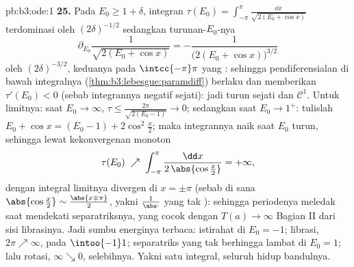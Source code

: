 \begin{solution}{pb:b3:ode:1}
\textbf{25.} Pada $E_0 \geq 1 + \delta$, integran
$\tau(E_0) = \int_{-\pi}^{\pi}\frac{\dd x}{\sqrt{2(E_0 +
\cos x)}}$ terdominasi oleh $(2\delta)^{-1/2}$ sedangkan
turunan-$E_0$-nya
\[
\partial_{E_0}\frac1{\sqrt{2(E_0 + \cos x)}}
= -\frac{1}{\bigl(2(E_0 + \cos x)\bigr)^{3/2}}
\]
oleh $(2\delta)^{-3/2}$, keduanya  pada
$\intcc{-\pi}\pi$ yang : sehingga pendiferensialan di bawah integralnya
(\cref{thm:b3:lebesgue:paramdiff}) berlaku dan memberikan
$\tau'(E_0) < 0$ (sebab integrannya negatif sejati):
jadi turun sejati dan $\mathcal C^1$. Untuk limitnya: saat $E_0 \to
\infty$, $\tau \leq \frac{2\pi}{\sqrt{2(E_0 - 1)}} \to 0$;
sedangkan saat $E_0 \to 1^+$: tulislah $E_0 + \cos x = (E_0 - 1) +
2\cos^2\frac x2$; maka integrannya naik saat $E_0$
turun, sehingga lewat kekonvergenan monoton
\[
\tau(E_0) \;\nearrow\;
\int_{-\pi}^{\pi}\frac{\dd x}{2\,\abs{\cos\frac x2}}
= +\infty,
\]
dengan integral limitnya divergen di $x = \pm\pi$ (sebab di sana
$\abs{\cos\frac x2} \sim \frac{\abs{x \mp \pi}}2$, yakni
$\frac1{\abs\cdot}$ yang tak ): sehingga periodenya meledak
saat mendekati separatriksnya, yang cocok dengan $T(a) \to
\infty$ Bagian II dari sisi librasinya. Jadi sumbu
energinya terbaca: istirahat di $E_0 = -1$; librasi, $2\pi \nearrow
\infty$, pada $\intoo{-1}1$; separatriks yang tak berhingga lambat di
$E_0 = 1$; lalu rotasi, $\infty \searrow 0$, selebihnya. Yakni satu
integral, seluruh hidup bandulnya.

\end{solution}
